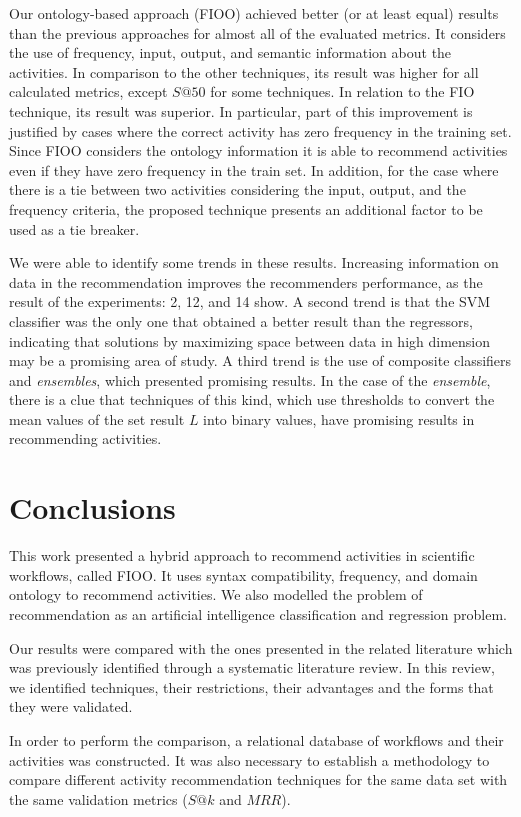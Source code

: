 \documentclass{doublecol-new}
\theoremstyle{TH}{
\newtheorem{lemma}{Lemma}
\newtheorem{theorem}[lemma]{Theorem}
\newtheorem{corrolary}[lemma]{Corrolary}
\newtheorem{conjecture}[lemma]{Conjecture}
\newtheorem{proposition}[lemma]{Proposition}
\newtheorem{claim}[lemma]{Claim}
\newtheorem{stheorem}[lemma]{Wrong Theorem}
\newtheorem{algorithm}{Algorithm}
}
\theoremstyle{THrm}{
\newtheorem{definition}{Definition}[section]
\newtheorem{question}{Question}[section]
\newtheorem{remark}{Remark}
\newtheorem{scheme}{Scheme}
}
\theoremstyle{THhit}{
\newtheorem{case}{Case}[section]
}
\begin{document}
Our ontology-based approach (FIOO) achieved better (or at least equal) results than the previous approaches for almost all of the evaluated metrics. It considers the use of frequency, input, output, and semantic information about the activities. In comparison to the other techniques, its result was higher for all calculated metrics, except \(S@50\) for some techniques. In relation to the FIO technique, its result was superior. In particular, part of this improvement is justified by cases where the correct activity has zero frequency in the training set. Since FIOO considers the ontology information it is able to recommend activities even if they have zero frequency in the train set. In addition, for the case where there is a tie between two activities considering the input, output, and the frequency criteria, the proposed technique presents an additional factor to be used as a tie breaker.

We were able to identify some trends in these results. Increasing information on data in the recommendation improves the recommenders performance, as the result of the experiments: 2, 12, and 14 show. A second trend is that the SVM classifier was the only one that obtained a better result than the regressors, indicating that solutions by maximizing space between data in high dimension may be a promising area of ​​study. A third trend is the use of composite classifiers and \emph{ensembles}, which presented promising results. In the case of the \emph{ensemble}, there is a clue that techniques of this kind, which use thresholds to convert the mean values ​​of the set result \(L\) into binary values, have promising results in recommending activities.

\section*{Conclusions}
This work presented a hybrid approach to recommend activities in scientific workflows, called FIOO. It uses syntax compatibility, frequency, and domain ontology to recommend activities. We also modelled the problem of recommendation as an artificial intelligence classification and regression problem. 

Our results were compared with the ones presented in the related literature which was previously identified through a systematic literature review. In this review, we identified techniques, their restrictions, their advantages and the forms that they were validated. 

In order to perform the comparison, a relational database of workflows and their activities was constructed. It was also necessary to establish a methodology to compare different activity recommendation techniques for the same data set with the same validation metrics (\(S@k\) and \(MRR\)).
\end{document}
